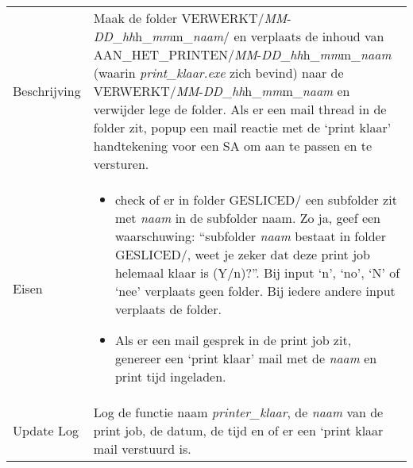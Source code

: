 \documentclass{article}
\newcommand{\quotes}[1]{``#1''}
\begin{document}
\begin{table}[H]
    \centering
    \begin{tabular}%
    {>{\raggedright\arraybackslash}p{}%
    |>{\raggedright\arraybackslash}p{}}
    \rowcolor{myblue} \multicolumn{2}{c}{\rule{0pt}{13pt}Functie: {\Large printer\_klaar.exe}} \\\hline
    Beschrijving & Maak de folder VERWERKT/\textit{MM}-\textit{DD}\_\textit{hh}h\_\textit{mm}m\_\textit{naam}/ en verplaats de inhoud van AAN\_HET\_PRINTEN/\textit{MM}-\textit{DD}\_\textit{hh}h\_\textit{mm}m\_\textit{naam} (waarin \textit{print\_klaar.exe} zich bevind) naar de VERWERKT/\textit{MM}-\textit{DD}\_\textit{hh}h\_\textit{mm}m\_\textit{naam} en verwijder lege de folder. Als er een mail thread in de folder zit, popup een mail reactie met de `print klaar' handtekening voor een SA om aan te passen en te versturen.\\ Eisen & 
    \begin{itemize} 
      \item check of er in folder GESLICED/ een subfolder zit met \textit{naam} in de subfolder naam. Zo ja, geef een waarschuwing: \quotes{subfolder \textit{naam} bestaat in folder GESLICED/, weet je zeker dat deze print job helemaal klaar is (Y/n)?}. Bij input `n', `no', `N' of `nee' verplaats geen folder. Bij iedere andere input verplaats de folder.
\item Als er een mail gesprek in de print job zit, genereer een `print klaar' mail met de \textit{naam} en print tijd ingeladen.
\end{itemize} \\
  Update Log& Log de functie naam \textit{printer\_klaar}, de \textit{naam} van de print job, de datum, de tijd en of er een `print klaar
   mail verstuurd is.\\
    \end{tabular}
\end{table}
\end{document}
